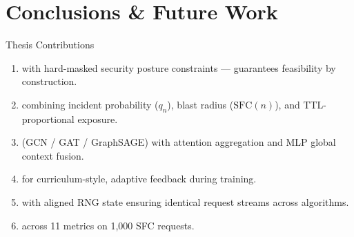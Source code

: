 \section{Conclusions \& Future Work}

\begin{frame}{Thesis Contributions}
  \begin{enumerate}
    \item {} with hard-masked security posture constraints --- guarantees feasibility by construction.
    \vspace{4pt}
    \item {} combining incident probability ($q_n$), blast radius ($\mathrm{SFC}(n)$), and TTL-proportional exposure.
    \vspace{4pt}
    \item {} (GCN / GAT / GraphSAGE) with attention aggregation and MLP global context fusion.
    \vspace{4pt}
    \item {} for curriculum-style, adaptive feedback during training.
    \vspace{4pt}
    \item {} with aligned RNG state ensuring identical request streams across algorithms.
    \vspace{4pt}
    \item {} across 11 metrics on 1,000 SFC requests.
  \end{enumerate}
\end{frame}

